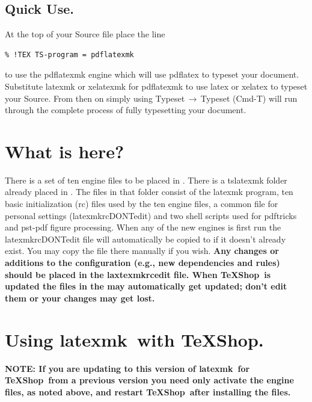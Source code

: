 \documentclass[11pt]{article}
\newcommand{\mnu}[1]{\textsf{#1}}
\newcommand{\cmd}[1]{\textsf{#1}}
\newcommand{\To}{\,\(\to\)\,}
\newcommand{\TS}{\textsf{\TeX Shop}}
\newcommand{\latexmk}{\textsf{latexmk}}
\begin{document}
\subsection{Quick Use.}

At the top of your Source file place the line
\begin{verbatim}
% !TEX TS-program = pdflatexmk
\end{verbatim}
to use the \cmd{pdflatexmk} engine which will use \cmd{pdflatex} to typeset your document. Substitute \cmd{latexmk} or \cmd{xelatexmk} for \cmd{pdflatexmk} to use \cmd{latex} or \cmd{xelatex} to typeset your Source. From then on simply using \mnu{Typeset}\To\mnu{Typeset} (\cmd{Cmd-T}) will run through the complete process of fully typesetting your document.

\section{What is here?}

There is a set of ten \cmd{engine} files to be placed in . There is a \cmd{tslatexmk} folder already placed in . The files in that folder consist of the \cmd{latexmk} program, ten basic initialization (\cmd{rc}) files used by the ten \cmd{engine} files, a common file for personal settings (\cmd{latexmkrcDONTedit}) and two shell scripts used for \cmd{pdftricks} and \cmd{pst-pdf} figure processing. When any of the new engines is first run the \cmd{latexmkrcDONTedit} file will automatically be copied to  if it doesn't already exist. You may copy the file there manually if you wish. \textbf{Any changes or additions to the configuration (e.g., new dependencies and rules) should be placed in the \cmd{laxtexmkrcedit} file. When \TS\ is updated the files in the  may automatically get updated; don't edit them or your changes may get lost.}

\section{Using \latexmk\ with \TS.}

\textbf{NOTE: If you are updating to this version of \latexmk\ for \TS\ from a previous version you need only activate the engine files, as noted above, and restart \TS\ after installing the files.}
\end{document}
